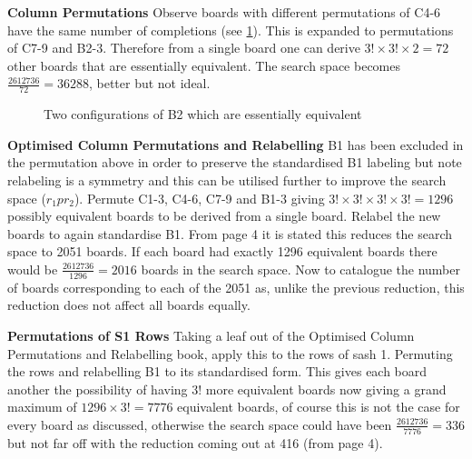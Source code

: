 \documentclass[a4paper,11pt]{report}
\newcounter{row}
\newcounter{col}
\newcounter{rowb}
\newcounter{colb}
\newcommand\setrowb[3]{
\setcounter{colb}{1}
\foreach \n in {#1, #2, #3} {
\edef\x{\value{colb} - 0.5}
\edef\y{3.5 - \value{rowb}}
\node[anchor=center] at (\x, \y) {\n};
\stepcounter{colb}
}
\stepcounter{rowb}
}
\begin{document}
\textbf{Column Permutations}
Observe boards with different permutations of C4-6 have the same number of completions (see \ref{fig:equiv99}). This is expanded to permutations of C7-9 and B2-3. Therefore from a single board one can derive $3!\times3!\times2=72$ other boards that are essentially equivalent. The search space becomes $\frac{2612736}{72}=36288$, better but not ideal.

\begin{figure}[h!]
\centering
{}
\caption{\label{fig:equiv99}Two configurations of B2 which are essentially equivalent}
\end{figure}

\textbf{Optimised Column Permutations and Relabelling}
B1 has been excluded in the permutation above in order to preserve the standardised B1 labeling but note relabeling is a symmetry and this can be utilised further to improve the search space ($r_1pr_2$). Permute C1-3, C4-6, C7-9 and B1-3 giving $3!\times 3!\times 3! \times 3!=1296$ possibly equivalent boards to be derived from a single board. Relabel the new boards to again standardise B1. From \cite{felgenhauer2005enumerating} page 4 it is stated this reduces the search space to 2051 boards. If each board had exactly 1296 equivalent boards there would be $\frac{2612736}{1296}= 2016$ boards in the search space. Now to catalogue the number of boards corresponding to each of the 2051 as, unlike the previous reduction, this reduction does not affect all boards equally.

\textbf{Permutations of S1 Rows}
Taking a leaf out of the Optimised Column Permutations and Relabelling book, apply this to the rows of sash 1. Permuting the rows and relabelling B1 to its standardised form. This gives each board another the possibility of having $3!$ more equivalent boards now giving a grand maximum of $1296\times 3!=7776$ equivalent boards, of course this is not the case for every board as discussed, otherwise the search space could have been $\frac{2612736}{7776}=336$ but not far off with the reduction coming out at 416 (from \cite{felgenhauer2005enumerating} page 4).
\end{document}
